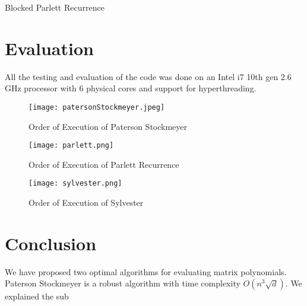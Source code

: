 \documentclass[12pt,a4paper]{article}
\begin{document}
\begin{algorithm}
\caption{Blocked Parlett Recurrence}\label{euclid}
\begin{algorithmic}[1]
    \EndFor
\EndFor
\end{algorithmic}
\end{algorithm}

\newpage
\section{Evaluation}

All the testing and evaluation of the code was done on an Intel i7 10th gen 2.6 GHz processor with 6 physical cores and support for hyperthreading. 

\begin{figure}
    \centering
    \texttt{[image: patersonStockmeyer.jpeg]}
    \caption{Order of Execution of Paterson Stockmeyer}
\end{figure}


\begin{figure}
    \centering
    \texttt{[image: parlett.png]}
    \caption{Order of Execution of Parlett Recurrence}
\end{figure}


\begin{figure}
    \centering
    \texttt{[image: sylvester.png]}
    \caption{Order of Execution of Sylvester}
\end{figure}
\newpage
\section{Conclusion}

We have proposed two optimal algorithms for evaluating matrix polynomials. Paterson Stockmeyer is a robust algorithm with time complexity $O(n^3\sqrt{d})$. We explained the sub


\newpage

\end{document}
